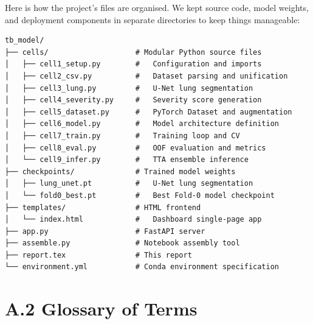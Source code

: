 \documentclass[12pt]{report}
\begin{document}
Here is how the project's files are organised. We kept source code, model weights, and deployment components in separate directories to keep things manageable:

\begin{verbatim}
tb_model/
├── cells/                    # Modular Python source files
│   ├── cell1_setup.py        #   Configuration and imports
│   ├── cell2_csv.py          #   Dataset parsing and unification
│   ├── cell3_lung.py         #   U-Net lung segmentation
│   ├── cell4_severity.py     #   Severity score generation
│   ├── cell5_dataset.py      #   PyTorch Dataset and augmentation
│   ├── cell6_model.py        #   Model architecture definition
│   ├── cell7_train.py        #   Training loop and CV
│   ├── cell8_eval.py         #   OOF evaluation and metrics
│   └── cell9_infer.py        #   TTA ensemble inference
├── checkpoints/              # Trained model weights
│   ├── lung_unet.pt          #   U-Net lung segmentation
│   └── fold0_best.pt         #   Best Fold-0 model checkpoint
├── templates/                # HTML frontend
│   └── index.html            #   Dashboard single-page app
├── app.py                    # FastAPI server
├── assemble.py               # Notebook assembly tool
├── report.tex                # This report
└── environment.yml           # Conda environment specification
\end{verbatim}

\section*{A.2 Glossary of Terms}
\end{document}
